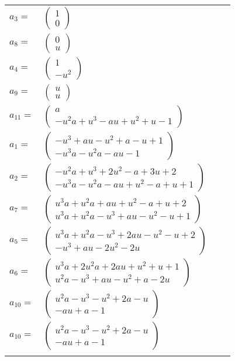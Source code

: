 \documentclass[1p]{elsarticle_modified}
\theoremstyle{definition}
\begin{document}
\begin{tabular}{m{7pt} m{180pt} m{7pt} m{180pt} }
\flushright $a_{3}=$&$\begin{pmatrix}1\\0\end{pmatrix}$ \\
\flushright $a_{8}=$&$\begin{pmatrix}0\\u\end{pmatrix}$ \\
\flushright $a_{4}=$&$\begin{pmatrix}1\\- u^2\end{pmatrix}$ \\
\flushright $a_{9}=$&$\begin{pmatrix}u\\u\end{pmatrix}$ \\
\flushright $a_{11}=$&$\begin{pmatrix}a\\- u^2 a+u^3- a u+u^2+u-1\end{pmatrix}$ \\
\flushright $a_{1}=$&$\begin{pmatrix}- u^3+a u- u^2+a- u+1\\- u^3 a- u^2 a- a u-1\end{pmatrix}$ \\
\flushright $a_{2}=$&$\begin{pmatrix}- u^2 a+u^3+2 u^2- a+3 u+2\\- u^3 a- u^2 a- a u+u^2- a+u+1\end{pmatrix}$ \\
\flushright $a_{7}=$&$\begin{pmatrix}u^3 a+u^2 a+a u+u^2- a+u+2\\u^3 a+u^2 a- u^3+a u- u^2- u+1\end{pmatrix}$ \\
\flushright $a_{5}=$&$\begin{pmatrix}u^3 a+u^2 a- u^3+2 a u- u^2- u+2\\- u^3+a u-2 u^2-2 u\end{pmatrix}$ \\
\flushright $a_{6}=$&$\begin{pmatrix}u^3 a+2 u^2 a+2 a u+u^2+u+1\\u^2 a- u^3+a u- u^2+a-2 u\end{pmatrix}$ \\
\flushright $a_{10}=$&$\begin{pmatrix}u^2 a- u^3- u^2+2 a- u\\- a u+a-1\end{pmatrix}$\\ \flushright $a_{10}=$&$\begin{pmatrix}u^2 a- u^3- u^2+2 a- u\\- a u+a-1\end{pmatrix}$\\&\end{tabular}
\end{document}
